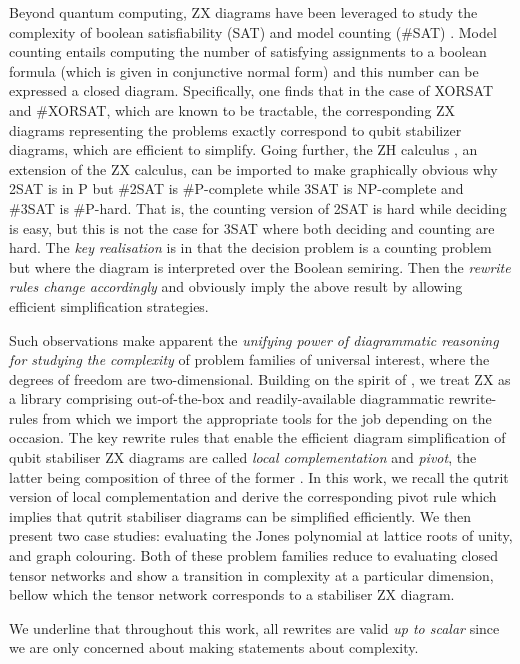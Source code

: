 Beyond quantum computing, ZX diagrams have been leveraged to study the complexity of boolean satisfiability (SAT) and model counting (\#SAT) \cite{debeaudrap2020tensor}.
Model counting entails computing the number of satisfying assignments to a boolean formula (which is given in conjunctive normal form)
and this number can be expressed a closed diagram.
Specifically, one finds that in the case of XORSAT and \#XORSAT,
which are known to be tractable,
the corresponding ZX diagrams representing the problems exactly correspond to qubit stabilizer diagrams, which are efficient to simplify.
Going further, the ZH calculus \cite{backens2018zh}, an extension of the ZX calculus, can be imported to make graphically obvious
why 2SAT is in P but \#2SAT is \#P-complete while 3SAT is NP-complete and \#3SAT is \#P-hard.
That is, the counting version of 2SAT is hard while deciding is easy, but this is not the case for 3SAT where both deciding and counting are hard.
The \emph{key realisation} is in that the decision problem is a counting problem
but where the diagram is interpreted over the Boolean semiring.
Then the \emph{rewrite rules change accordingly} and obviously imply the above result by allowing efficient simplification strategies.

Such observations make apparent the \emph{unifying power of diagrammatic reasoning
for studying the complexity} of problem families of universal interest,
where the degrees of freedom are two-dimensional.
Building on the spirit of \cite{debeaudrap2020tensor}, we treat ZX as a library comprising out-of-the-box and readily-available diagrammatic rewrite-rules from which we import the appropriate tools for the job depending on the occasion.
The key rewrite rules that enable the efficient diagram simplification
of qubit stabiliser ZX diagrams
are called \emph{local complementation} and \emph{pivot},
the latter being composition of three of the former \cite{graph_theoretic_simplification}.
In this work, we recall the qutrit version of local complementation and derive the corresponding pivot rule
which implies that qutrit stabiliser diagrams can be simplified efficiently.
We then present two case studies: evaluating the Jones polynomial at lattice roots of unity, and graph colouring.
Both of these problem families reduce to evaluating
closed tensor networks and show a transition in complexity
at a particular dimension, bellow which the tensor network corresponds to a stabiliser ZX diagram.

We underline that throughout this work, all rewrites are valid
\emph{up to scalar}
since we are only concerned about making statements about complexity.